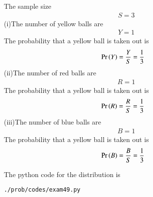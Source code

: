 The sample size 
\begin{align}
S=3
\end{align}
(i)The number of yellow balls are
\begin{align}
Y=1
\end{align}
The probability that a yellow ball is taken out is 
\begin{align}
\Pr\left(Y\right) = \frac{Y}{S} &= \frac{1}{3}
\end{align}
(ii)The number of red balls are
\begin{align}
R=1
\end{align}
The probability that a yellow ball is taken out is 
\begin{align}
\Pr\left(R\right) = \frac{R}{S} &= \frac{1}{3}
\end{align}
(iii)The number of blue balls are
\begin{align}
B=1
\end{align}
The probability that a yellow ball is taken out is 
\begin{align}
\Pr\left(B\right) = \frac{B}{S} &= \frac{1}{3}
\end{align}


The python code for the distribution is
\begin{lstlisting}
./prob/codes/exam49.py
\end{lstlisting}
